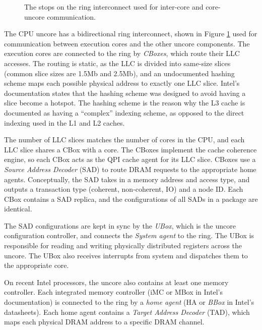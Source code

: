 
\begin{figure}[hbt]
  \caption{
    The stops on the ring interconnect used for inter-core and core-uncore
    communication.
  }
  \label{fig:cpu_uncore}
\end{figure}

The CPU uncore has a bidirectional ring interconnect, shown in Figure
\ref{fig:cpu_uncore} used for communication between execution cores and the
other uncore components. The execution cores are connected to the ring by
\textit{CBoxes}, which route their LLC accesses. The routing is static, as the
LLC is divided into same-size slices (common slice sizes are 1.5Mb and 2.5Mb),
and an undocumented hashing scheme maps each possible physical address to
exactly one LLC slice. Intel's documentation states that the hashing scheme was
designed to avoid having a slice become a hotspot. The hashing scheme is the
reason why the L3 cache is documented as having a ``complex'' indexing scheme,
as opposed to the direct indexing used in the L1 and L2 caches.

The number of LLC slices matches the number of cores in the CPU, and each LLC
slice shares a CBox with a core. The CBoxes implement the cache coherence
engine, so each CBox acts as the QPI cache agent for its LLC slice. CBoxes
use a \textit{Source Address Decoder} (SAD) to route DRAM requests to the
appropriate home agents. Conceptually, the SAD takes in a memory address and
access type, and outputs a transaction type (coherent, non-coherent, IO) and a
node ID. Each CBox contains a SAD replica, and the configurations of all SADs
in a package are identical.

The SAD configurations are kept in sync by the \textit{UBox}, which is the
uncore configuration controller, and connects the \textit{System agent} to the
ring. The UBox is responsible for reading and writing physically distributed
registers across the uncore. The UBox also receives interrupts from system and
dispatches them to the appropriate core.

On recent Intel processors, the uncore also contains at least one memory
controller. Each integrated memory controller (iMC or MBox in Intel's
documentation) is connected to the ring by a \textit{home agent} (HA or
\textit{BBox} in Intel's datasheets). Each home agent contains a
\textit{Target Address Decoder} (TAD), which maps each physical DRAM address to
a specific DRAM channel.
